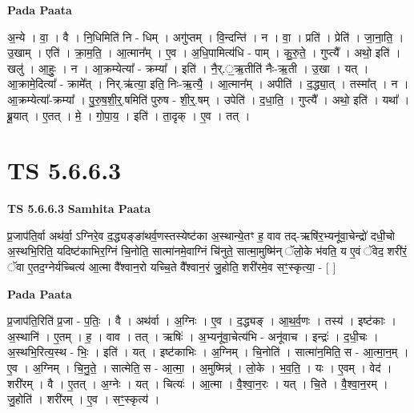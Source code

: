 \documentclass[17pt]{extarticle}
\begin{document}
\textbf{Pada Paata} \newline

अ॒न्ये । वा॒ । वै । नि॒धिमिति॑ नि - धिम् । अगु॑प्तम् । वि॒न्दन्ति॑ । न । वा॒ । प्रति॑ । प्रेति॑ । जा॒ना॒ति॒ । उ॒खाम् । एति॑ । क्रा॒म॒ति॒ । आ॒त्मान᳚म् । ए॒व । अ॒धि॒पामित्य॑धि - पाम् । कु॒रु॒ते॒ । गुप्त्यै᳚ । अथो॒ इति॑ । खलु॑ । आ॒हुः॒ । न । आ॒क्रम्येत्या᳚ - क्रम्या᳚ । इति॑ । नै॒र्.॒ऋ॒तीति॑ नैः-ऋ॒ती । उ॒खा । यत् । आ॒क्रामे॒दित्या᳚ - क्रामे᳚त् । निर्.ऋ॑त्या॒ इति॒ निः-ऋ॒त्यै॒ । आ॒त्मान᳚म् । अपीति॑ । द॒द्ध्या॒त् । तस्मा᳚त् । न । आ॒क्रम्येत्या᳚-क्रम्या᳚ । पु॒रु॒ष॒शी॒र्॒.षमिति॑ पुरुष - शी॒र्॒.षम् । उपेति॑ । द॒धा॒ति॒ । गुप्त्यै᳚ । अथो॒ इति॑ । यथा᳚ । ब्रू॒यात् । ए॒तत् । मे॒ । गो॒पा॒य॒ । इति॑ । ता॒दृक् । ए॒व । तत् ।  \newline




\section*{ TS 5.6.6.3 }

\textbf{TS 5.6.6.3 } \newline
\textbf{Samhita Paata} \newline

प्र॒जाप॑ति॒र्वा अथ॑र्वा॒ ऽग्निरे॒व द॒द्ध्यङ्ङा॑थर्व॒णस्तस्येष्ट॑का अ॒स्थान्ये॒तꣳ ह॒ वाव तद्-ऋषि॑र॒भ्यनू॑वा॒चेन्द्रो॑ दधी॒चो अ॒स्थभि॒रिति॒ यदिष्ट॑काभिर॒ग्निं चि॒नोति॒ सात्मा॑नमे॒वाग्निं चि॑नुते॒ सात्मा॒मुष्मि॑न् ॅलो॒के भ॑वति॒ य ए॒वं ॅवेद॒ शरी॑रं॒ ॅवा ए॒तद॒ग्नेर्यच्चित्य॑ आ॒त्मा वै᳚श्वान॒रो यच्चि॒ते वै᳚श्वान॒रं जु॒होति॒ शरी॑रमे॒व सꣳ॒॒स्कृत्या॒ - [  ] \newline

\textbf{Pada Paata} \newline

प्र॒जाप॑ति॒रिति॑ प्र॒जा - प॒तिः॒ । वै । अथ॑र्वा । अ॒ग्निः । ए॒व । द॒द्ध्यङ् । आ॒थ॒र्व॒णः । तस्य॑ । इष्ट॑काः । अ॒स्थानि॑ । ए॒तम् । ह॒ । वाव । तत् । ऋषिः॑ । अ॒भ्यनू॑वा॒चेत्य॑भि - अनू॑वाच । इन्द्रः॑ । द॒धी॒चः । अ॒स्थभि॒रित्य॒स्थ - भिः॒ । इति॑ । यत् । इष्ट॑काभिः । अ॒ग्निम् । चि॒नोति॑ । सात्मा॑न॒मिति॒ स - आ॒त्मा॒न॒म् । ए॒व । अ॒ग्निम् । चि॒नु॒ते॒ । सात्मेति॒ स - आ॒त्मा॒ । अ॒मुष्मिन्न्॑ । लो॒के । भ॒व॒ति॒ । यः । ए॒वम् । वेद॑ । शरी॑रम् । वै । ए॒तत् । अ॒ग्नेः । यत् । चित्यः॑ । आ॒त्मा । वै॒श्वा॒न॒रः । यत् । चि॒ते । वै॒श्वा॒न॒रम् । जु॒होति॑ । शरी॑रम् । ए॒व । सꣳ॒॒स्कृत्य॑ ।  \newline
\end{document}
